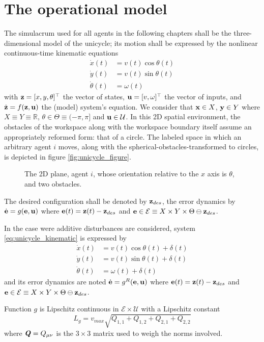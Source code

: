 \section{The operational model}

The simulacrum used for all agents in the following chapters shall be the
three-dimensional model of the unicycle; its motion shall be expressed by the
nonlinear continuous-time kinematic equations
\begin{align}
  \dot{x}(t)       &= v(t) \cos\theta(t) \\
  \dot{y}(t)       &= v(t) \sin\theta(t) \\
  \dot{\theta}(t)  &= \omega(t)
\label{eq:unicycle_kinematic}
\end{align}
with $\bm{\mathbf{z}} = [x,y,\theta]^{\top}$ the vector of states,
$\bm{\mathbf{u}} = [v, \omega]^{\top}$ the vector of inputs, and $\dot{\bm{\mathbf{z}}} =
f(\bm{\mathbf{z}}, \bm{\mathbf{u}})$ the (model) system's equation. We consider that
$\bm{\mathbf{x}} \in X$, $\bm{\mathbf{y}} \in Y$ where $X \equiv Y \equiv \mathbb{R}$,
$\theta \in \Theta \equiv (-\pi, \pi]$ and $\bm{\mathbf{u}} \in \mathcal{U}$.
In this 2D spatial environment, the obstacles of the workspace along with the
workspace boundary itself assume an appropriately reformed form: that of a
circle. The labeled space in which an arbitrary agent $i$ moves, along with the
spherical-obstacles-transformed to circles, is depicted in figure
\eqref{fig:unicycle_figure}.

\begin{figure}[H]\centering
  
  \caption{The 2D plane, agent $i$, whose orientation relative to the $x$
    axis is $\theta$, and two obstacles.}
  \label{fig:unicycle_figure}
\end{figure}
The desired configuration shall be denoted by $\bm{\mathbf{z}}_{des}$,
the error dynamics by $\dot{\bm{\mathbf{e}}} = g(\bm{\mathbf{e}}, \bm{\mathbf{u}})$
where $\bm{\mathbf{e}}(t) = \bm{\mathbf{z}}(t) - \bm{\mathbf{z}}_{des}$ and
$\bm{\mathbf{e}} \in \mathcal{E} \equiv X \times Y \times \Theta \ominus \bm{\mathbf{z}}_{des}$.

In the case were additive disturbances are considered, system
\eqref{eq:unicycle_kinematic} is expressed by
\begin{align}
  \dot{x}(t)       &= v(t) \cos\theta(t) + \delta(t) \\
  \dot{y}(t)       &= v(t) \sin\theta(t) + \delta(t) \\
  \dot{\theta}(t)  &= \omega(t) + \delta(t)
\label{eq:unicycle_kinematic_with_disturbances}
\end{align}
and its error dynamics are noted $\dot{\bm{\mathbf{e}}} = g^R(\bm{\mathbf{e}}, \bm{\mathbf{u}})$
where $\bm{\mathbf{e}}(t) = \bm{\mathbf{z}}(t) - \bm{\mathbf{z}}_{des}$ and
$\bm{\mathbf{e}} \in \mathcal{E} \equiv X \times Y \times \Theta \ominus \bm{\mathbf{z}}_{des}$.

\begin{lemma}
  \label{lemma:lipschitz_unicycle}
  Function $g$ is Lipschitz continuous in $\mathcal{E} \times \mathcal{U}$ with
  a Lipschitz constant $$L_g = v_{max} \sqrt{Q_{1,1}+Q_{1,2}+Q_{2,1}+Q_{2,2}}$$
  where $\bm{\mathit{Q}} = Q_{\mu\nu}$ is the $3 \times 3$ matrix used to weigh the
  norms involved.
\end{lemma}
